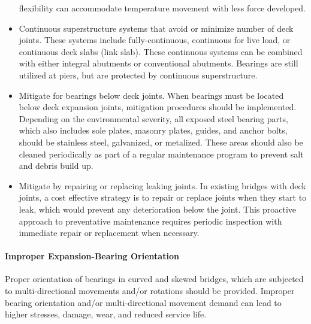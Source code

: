 \begin{itemize}
  flexibility can accommodate temperature movement with less force developed.
  \item Continuous superstructure systems that avoid or minimize number of deck joints. These systems include
  fully-continuous, continuous for live load, or continuous deck slabs (link slab). These continuous systems
  can be combined with either integral abutments or conventional abutments. Bearings are still utilized at
  piers, but are protected by continuous superstructure.
  \item Mitigate for bearings below deck joints. When bearings must be located below deck expansion joints,
  mitigation procedures should be implemented. Depending on the environmental severity, all exposed steel
  bearing parts, which also includes sole plates, masonry plates, guides, and anchor bolts, should be stainless
  steel, galvanized, or metalized. These areas should also be cleaned periodically as part of a regular
  maintenance program to prevent salt and debris build up.
  \item Mitigate by repairing or replacing leaking joints. In existing bridges with deck joints, a cost effective
  strategy is to repair or replace joints when they start to leak, which would prevent any deterioration below the
  joint. This proactive approach to preventative maintenance requires periodic inspection with immediate
  repair or replacement when necessary.
\end{itemize}

\paragraph{Improper Expansion-Bearing Orientation}
Proper orientation of bearings in curved and skewed bridges, which are subjected to multi-directional movements
and/or rotations should be provided. Improper bearing orientation and/or multi-directional movement demand can
lead to higher stresses, damage, wear, and reduced service life.

